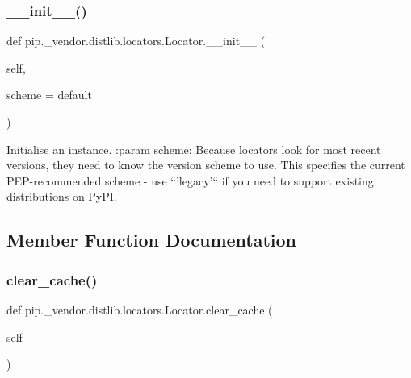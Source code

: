\subsubsection{\texorpdfstring{\+\_\+\+\_\+init\+\_\+\+\_\+()}{\_\_init\_\_()}}
{\footnotesize\ttfamily def pip.\+\_\+vendor.\+distlib.\+locators.\+Locator.\+\_\+\+\_\+init\+\_\+\+\_\+ (\begin{DoxyParamCaption}\item[{}]{self,  }\item[{}]{scheme = {\ttfamily \textquotesingle{}default\textquotesingle{}} }\end{DoxyParamCaption})}

\begin{DoxyVerb}Initialise an instance.
:param scheme: Because locators look for most recent versions, they
       need to know the version scheme to use. This specifies
       the current PEP-recommended scheme - use ``'legacy'``
       if you need to support existing distributions on PyPI.
\end{DoxyVerb}
 

\subsection{Member Function Documentation}
\mbox{\label{classpip_1_1__vendor_1_1distlib_1_1locators_1_1Locator_aa8e1b24125b3cecddfa873c5ded5f3bb}} 
\subsubsection{\texorpdfstring{clear\+\_\+cache()}{clear\_cache()}}
{\footnotesize\ttfamily def pip.\+\_\+vendor.\+distlib.\+locators.\+Locator.\+clear\+\_\+cache (\begin{DoxyParamCaption}\item[{}]{self }\end{DoxyParamCaption})}

\mbox{\label{classpip_1_1__vendor_1_1distlib_1_1locators_1_1Locator_a3d419a5885dcd829fd06b8230c8495e8}} 
